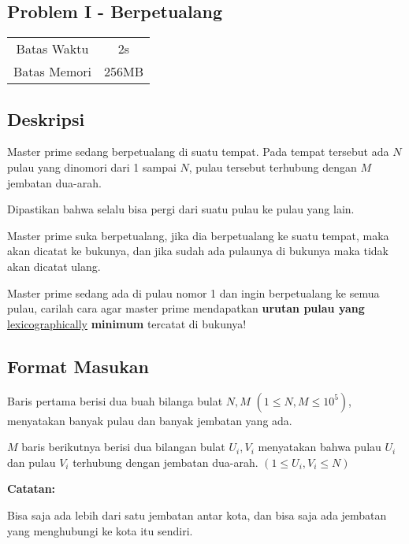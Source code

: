 \documentclass{article}
\begin{document}
\begin{center}
    \section*{Problem I - Berpetualang} %

    \begin{tabular}{ | c c | }
        \hline
        Batas Waktu  & 2s \\    %
        Batas Memori & 256MB \\  %
        \hline
    \end{tabular}
\end{center}

\subsection*{Deskripsi}

Master prime sedang berpetualang di suatu tempat. Pada tempat tersebut ada $N$ pulau yang dinomori dari 1 sampai $N$, pulau tersebut terhubung dengan $M$ jembatan dua-arah.

Dipastikan bahwa selalu bisa pergi dari suatu pulau ke pulau yang lain. 

Master prime suka berpetualang, jika dia berpetualang ke suatu tempat, maka akan dicatat ke bukunya, dan jika sudah ada pulaunya di bukunya maka tidak akan dicatat ulang.

Master prime sedang ada di pulau nomor 1 dan ingin berpetualang ke semua pulau, carilah cara agar master prime mendapatkan \textbf{urutan pulau yang} \href{https://en.wikipedia.org/wiki/Lexicographic_order}{lexicographically} \textbf{minimum} tercatat di bukunya!

\subsection*{Format Masukan}

Baris pertama berisi dua buah bilanga bulat $N, M$ $(1 \leq N, M \leq 10^5)$, menyatakan banyak pulau dan banyak jembatan yang ada.

$M$ baris berikutnya berisi dua bilangan bulat $U_i, V_i$ menyatakan bahwa pulau $U_i$ dan pulau $V_i$ terhubung dengan jembatan dua-arah. $(1 \leq U_i, V_i \leq N)$

\textbf{Catatan:}

Bisa saja ada lebih dari satu jembatan antar kota, dan bisa saja ada jembatan yang menghubungi ke kota itu sendiri.
\end{document}

